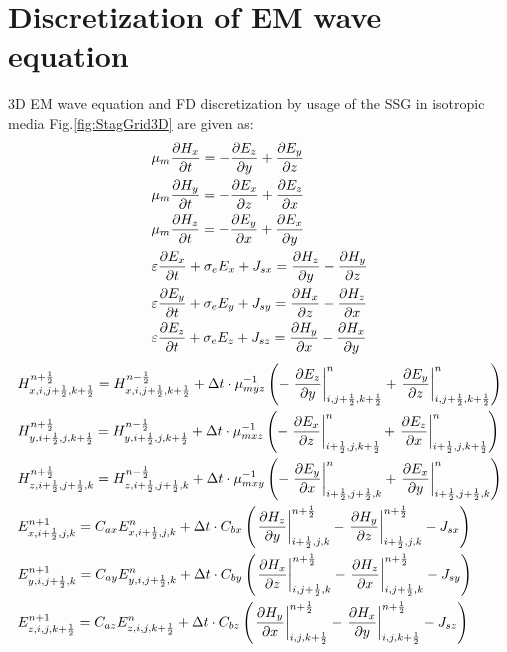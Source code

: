\documentclass[pdftex,a4paper,parskip,listof=totoc,bibliography=totoc,onehalfspacing,12pt]{scrreprt}
\begin{document}
\section{Discretization of EM wave equation}
3D EM wave equation and FD discretization by usage of the SSG in isotropic media Fig.\ref{fig:StagGrid3D} are given as:
\begin{equation}
\begin{align*}
  &\mu_{m} \pdv{H_{x}}{t} = -\pdv{E_z}{y} + \pdv{E_y}{z}\\
  &\mu_{m} \pdv{H_{y}}{t} = -\pdv{E_x}{z} + \pdv{E_z}{x}\\
  &\mu_{m} \pdv{H_{z}}{t} = -\pdv{E_y}{x} + \pdv{E_x}{y}\\
  &\varepsilon \pdv{E_{x}}{t} + \sigma_{e} E_{x} + J_{sx} = \pdv{H_z}{y} - \pdv{H_y}{z}\\
  &\varepsilon \pdv{E_{y}}{t} + \sigma_{e} E_{y} + J_{sy} = \pdv{H_x}{z} - \pdv{H_z}{x}\\
  &\varepsilon \pdv{E_{z}}{t} + \sigma_{e} E_{z} + J_{sz} = \pdv{H_y}{x} - \pdv{H_x}{y}
\end{align*}
\end{equation}
\begin{equation}
\begin{align*}
  &H_{x,i,j+\frac{1}{2},k+\frac{1}{2}}^{n+\frac{1}{2}} = H_{x,i,j+\frac{1}{2},k+\frac{1}{2}}^{n-\frac{1}{2}} + \Delta t \cdot \mu_{myz}^{-1}  \left(- \left.\pdv{ E_{z}}{y}\right\rvert_{i,j+\frac{1}{2},k+\frac{1}{2}}^{n} + \left.\pdv{ E_{y}}{z}\right\rvert_{i,j+\frac{1}{2},k+\frac{1}{2}}^{n} \right)\\
  &H_{y,i+\frac{1}{2},j,k+\frac{1}{2}}^{n+\frac{1}{2}} = H_{y,i+\frac{1}{2},j,k+\frac{1}{2}}^{n-\frac{1}{2}} + \Delta t \cdot \mu_{mxz}^{-1}  \left(- \left.\pdv{ E_{x}}{z}\right\rvert_{i+\frac{1}{2},j,k+\frac{1}{2}}^{n} + \left.\pdv{ E_z}{x}\right\rvert_{i+\frac{1}{2},j,k+\frac{1}{2}}^{n} \right)\\
  &H_{z,i+\frac{1}{2},j+\frac{1}{2},k}^{n+\frac{1}{2}} = H_{z,i+\frac{1}{2},j+\frac{1}{2},k}^{n-\frac{1}{2}} + \Delta t \cdot \mu_{mxy}^{-1}  \left(- \left.\pdv{ E_y}{x}\right\rvert_{i+\frac{1}{2},j+\frac{1}{2},k}^{n} + \left.\pdv{ E_x}{y}\right\rvert_{i+\frac{1}{2},j+\frac{1}{2},k}^{n} \right)\\
  &E_{x,i+\frac{1}{2},j,k}^{n+1} = C_{ax} E_{x,i+\frac{1}{2},j,k}^{n} + \Delta t \cdot C_{bx} \left( \left.\pdv{ H_z}{y}\right\rvert_{i+\frac{1}{2},j,k}^{n+\frac{1}{2}} - \left.\pdv{ H_y}{z}\right\rvert_{i+\frac{1}{2},j,k}^{n+\frac{1}{2}} - J_{sx} \right)\\
  &E_{y,i,j+\frac{1}{2},k}^{n+1} = C_{ay} E_{y,i,j+\frac{1}{2},k}^{n} + \Delta t \cdot C_{by} \left( \left.\pdv{ H_x}{z}\right\rvert_{i,j+\frac{1}{2},k}^{n+\frac{1}{2}} - \left.\pdv{ H_z}{x}\right\rvert_{i,j+\frac{1}{2},k}^{n+\frac{1}{2}} - J_{sy} \right)\\
  &E_{z,i,j,k+\frac{1}{2}}^{n+1} = C_{az} E_{z,i,j,k+\frac{1}{2}}^{n} + \Delta t \cdot C_{bz} \left( \left.\pdv{ H_y}{x}\right\rvert_{i,j,k+\frac{1}{2}}^{n+\frac{1}{2}} - \left.\pdv{ H_x}{y}\right\rvert_{i,j,k+\frac{1}{2}}^{n+\frac{1}{2}} - J_{sz} \right)
\end{align*}
\end{equation}
\end{document}
